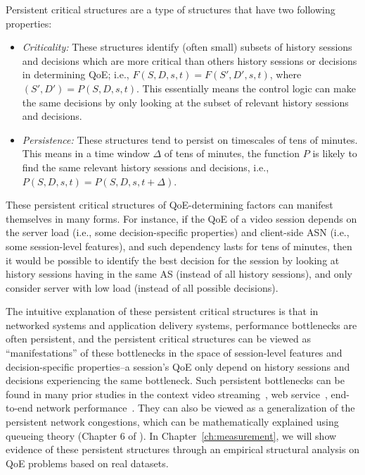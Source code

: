 Persistent critical structures are a type of structures that have two following 
properties:

\begin{itemize}

\item {\em Criticality:} These structures identify (often small) subsets of history
sessions and decisions which are more critical than others history sessions 
or decisions in determining QoE; i.e.,
$F(S,D,s,t)=F(S',D',s,t)$, where $(S',D')=P(S,D,s,t)$. This essentially
means the \ddn control logic can make the same decisions by
only looking at the subset of relevant history sessions and decisions.

\item {\em Persistence:} These structures tend to persist on timescales of 
tens of minutes. This means in a time window $\Delta$ 
of  tens of minutes, the function $P$ is likely 
to find the same relevant history sessions and decisions,
i.e., $P(S,D,s,t)=P(S,D,s,t+\Delta)$.

\end{itemize}


These persistent critical structures of QoE-determining factors can 
manifest themselves in many forms.
For instance, if the QoE of a video session depends on
the server load (i.e., some decision-specific properties)
and client-side ASN (i.e., some session-level features), and such
dependency lasts for tens of minutes,
then it would be possible to identify the best decision for
the session by looking
at history sessions having in the same AS 
(instead of all history sessions), and only consider server with 
low load (instead of all possible decisions).

The intuitive explanation of these persistent critical structures 
is that in networked systems and application delivery  systems, performance
bottlenecks are often persistent, and the persistent critical structures
can be viewed as ``manifestations'' of these bottlenecks in the space of 
session-level features and decision-specific properties--a session's QoE
only depend on history sessions and decisions 
experiencing the same bottleneck.
Such persistent bottlenecks can be found in many prior studies in the context
video streaming~\cite{cfa}, 
web service~\cite{footprint}, end-to-end
network performance~\cite{zhang2001constancy}.
They can also be viewed as a generalization of the persistent 
network congestions, which can be mathematically explained using queueing theory
(Chapter 6 of \cite{keshav2012mathematical}).
In Chapter~\ref{ch:measurement}, we will show evidence of these persistent
structures through an empirical structural analysis on  QoE
problems based on real datasets.

